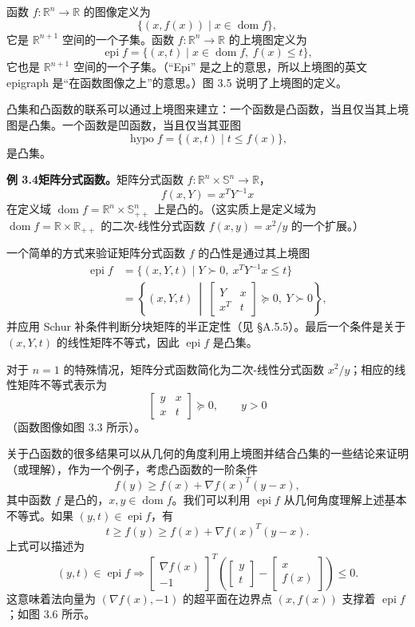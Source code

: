\documentclass[UTF8, 12pt, fontset=fandol, oneside]{ctexart}
\DeclareMathOperator{\dom}{dom}
\DeclareMathOperator{\epi}{epi}
\DeclareMathOperator{\hypo}{hypo}
\begin{document}
函数 $f:\mathbb{R}^n\to\mathbb{R}$ 的图像定义为
\[
\{(x,f(x))\mid x\in\dom f\},
\]
它是 $\mathbb{R}^{n+1}$ 空间的一个子集。函数 $f:\mathbb{R}^n\to\mathbb{R}$ 的上境图定义为
\[
\epi f=\{(x,t)\mid x\in\dom f,\ f(x)\leq t\},
\]
它也是 $\mathbb{R}^{n+1}$ 空间的一个子集。（“Epi” 是之上的意思，所以上境图的英文 epigraph 是“在函数图像之上”的意思。）图 3.5 说明了上境图的定义。

凸集和凸函数的联系可以通过上境图来建立：一个函数是凸函数，当且仅当其上境图是凸集。一个函数是凹函数，当且仅当其亚图
\[
\hypo f=\{(x,t)\mid t\leq f(x)\},
\]
是凸集。

\noindent\textbf{例 3.4\quad 矩阵分式函数。}\quad 矩阵分式函数 $f:\mathbb{R}^n\times\mathbb{S}^n\to\mathbb{R}$，
\[
f(x,Y)=x^TY^{-1}x
\]
在定义域 $\dom f=\mathbb{R}^n\times\mathbb{S}_{++}^n$ 上是凸的。（这实质上是定义域为 $\dom f=\mathbb{R}\times\mathbb{R}_{++}$ 的二次-线性分式函数 $f(x,y)=x^2/y$ 的一个扩展。）

一个简单的方式来验证矩阵分式函数 $f$ 的凸性是通过其上境图
\[
\begin{aligned}
\epi f
&=\{(x,Y,t)\mid Y\succ0,\ x^TY^{-1}x\leq t\}\\
&=\left\{(x,Y,t)\ \middle|\ 
\begin{bmatrix}
Y & x\\
x^T & t
\end{bmatrix}\succeq0,\ Y\succ0
\right\},
\end{aligned}
\]
并应用 Schur 补条件判断分块矩阵的半正定性（见 \S A.5.5）。最后一个条件是关于 $(x,Y,t)$ 的线性矩阵不等式，因此 $\epi f$ 是凸集。

对于 $n=1$ 的特殊情况，矩阵分式函数简化为二次-线性分式函数 $x^2/y$；相应的线性矩阵不等式表示为
\[
\begin{bmatrix}
y & x\\
x & t
\end{bmatrix}\succeq0,\qquad y>0
\]
（函数图像如图 3.3 所示）。

关于凸函数的很多结果可以从几何的角度利用上境图并结合凸集的一些结论来证明（或理解），作为一个例子，考虑凸函数的一阶条件
\[
f(y)\geq f(x)+\nabla f(x)^T(y-x),
\]
其中函数 $f$ 是凸的，$x,y\in\dom f$。我们可以利用 $\epi f$ 从几何角度理解上述基本不等式。如果 $(y,t)\in\epi f$，有
\[
t\geq f(y)\geq f(x)+\nabla f(x)^T(y-x).
\]
上式可以描述为
\[
(y,t)\in\epi f\Longrightarrow
\begin{bmatrix}
\nabla f(x)\\
-1
\end{bmatrix}^T
\left(
\begin{bmatrix}
y\\
t
\end{bmatrix}
-
\begin{bmatrix}
x\\
f(x)
\end{bmatrix}
\right)\leq0.
\]
这意味着法向量为 $(\nabla f(x),-1)$ 的超平面在边界点 $(x,f(x))$ 支撑着 $\epi f$；如图 3.6 所示。
\end{document}
